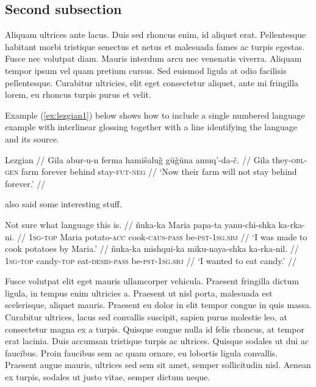 \documentclass[12pt,letterpaper]{article}
\begin{document}
\subsection{Second subsection}

Aliquam ultrices ante lacus. Duis sed rhoncus enim, id aliquet erat. Pellentesque habitant morbi tristique senectus et netus et malesuada fames ac turpis egestas. Fusce nec volutpat diam. Mauris interdum arcu nec venenatis viverra. Aliquam tempor ipsum vel quam pretium cursus. Sed euismod ligula at odio facilisis pellentesque. Curabitur ultricies, elit eget consectetur aliquet, ante mi fringilla lorem, eu rhoncus turpis purus et velit.

Example (\ref{ex:lezgian1}) below shows how to include a single numbered language example with interlinear glossing together with a line identifying the language and its source.

\ex\label{ex:lezgian1}
	\begingl
		\glpreamble Lezgian \parencite[207]{haspelmath1993} //
		\gla Gila abur-u-n ferma hamišaluǧ güǧüna amuq’-da-č. //
		\glb Gila they-\textsc{obl}-\textsc{gen} farm forever behind stay-\textsc{fut}-\textsc{neg} //
		\glft ‘Now their farm will not stay behind forever.’ //
	\endgl
\xe

\textcite{silk2012} also said some interesting stuff.

\pex\label{ex:passives}
	\glpreamble Not sure what language this is. //
	\a\begingl
		\gla ñuka-ka Maria papa-ta yanu-chi-shka ka-rka-ni. //
		\glb \textsc{1sg}-\textsc{top} Maria potato-\textsc{acc} cook-\textsc{caus}-\textsc{pass} be-\textsc{pst}-\textsc{1sg.sbj} //
		\glft ‘I was made to cook potatoes by Maria.’ //
	\endgl
	\a\begingl
		\gla ñuka-ka mishqui-ka miku-naya-shka ka-rka-nil. //
		\glb \textsc{1sg}-\textsc{top} candy-\textsc{top} eat-\textsc{desid}-\textsc{pass} be-\textsc{pst}-\textsc{1sg.sbj} //
		\glft ‘I wanted to eat candy.’ //
	\endgl
\xe

Fusce volutpat elit eget mauris ullamcorper vehicula. Praesent fringilla dictum ligula, in tempus enim ultricies a. Praesent ut nisl porta, malesuada est scelerisque, aliquet mauris. Praesent eu dolor in elit tempor congue in quis massa. Curabitur ultrices, lacus sed convallis suscipit, sapien purus molestie leo, at consectetur magna ex a turpis. Quisque congue nulla id felis rhoncus, at tempor erat lacinia. Duis accumsan tristique turpis ac ultrices. Quisque sodales ut dui ac faucibus. Proin faucibus sem ac quam ornare, eu lobortis ligula convallis. Praesent augue mauris, ultrices sed sem sit amet, semper sollicitudin nisl. Aenean ex turpis, sodales ut justo vitae, semper dictum neque.


\printbibliography
\end{document}
